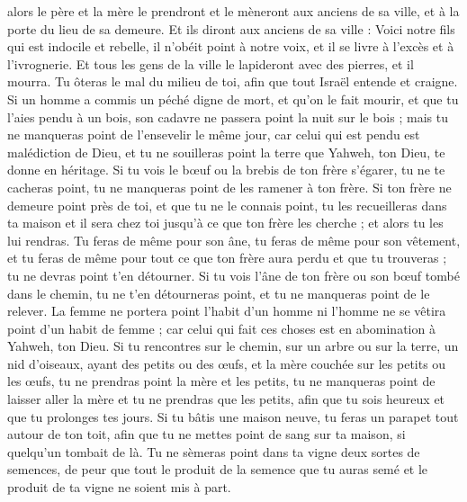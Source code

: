 \begin{multicols}{2}
alors le père et la mère le prendront et le mèneront aux anciens de sa ville, et à la porte du lieu de sa demeure.
Et ils diront aux anciens de sa ville : Voici notre fils qui est indocile et rebelle, il n'obéit point à notre voix, et il se livre à l'excès et à l'ivrognerie.
Et tous les gens de la ville le lapideront avec des pierres, et il mourra. Tu ôteras le mal du milieu de toi, afin que tout Israël entende et craigne.
Si un homme a commis un péché digne de mort, et qu'on le fait mourir, et que tu l'aies pendu à un bois,
son cadavre ne passera point la nuit sur le bois ; mais tu ne manqueras point de l'ensevelir le même jour, car celui qui est pendu est malédiction de Dieu, et tu ne souilleras point la terre que Yahweh, ton Dieu, te donne en héritage.
\VerseOne{}Si tu vois le bœuf ou la brebis de ton frère s'égarer, tu ne te cacheras point, tu ne manqueras point de les ramener à ton frère.
Si ton frère ne demeure point près de toi, et que tu ne le connais point, tu les recueilleras dans ta maison et il sera chez toi jusqu'à ce que ton frère les cherche ; et alors tu les lui rendras.
Tu feras de même pour son âne, tu feras de même pour son vêtement, et tu feras de même pour tout ce que ton frère aura perdu et que tu trouveras ; tu ne devras point t'en détourner.
Si tu vois l'âne de ton frère ou son bœuf tombé dans le chemin, tu ne t'en détourneras point, et tu ne manqueras point de le relever.
La femme ne portera point l'habit d'un homme ni l'homme ne se vêtira point d'un habit de femme ; car celui qui fait ces choses est en abomination à Yahweh, ton Dieu.
Si tu rencontres sur le chemin, sur un arbre ou sur la terre, un nid d'oiseaux, ayant des petits ou des œufs, et la mère couchée sur les petits ou les œufs, tu ne prendras point la mère et les petits,
tu ne manqueras point de laisser aller la mère et tu ne prendras que les petits, afin que tu sois heureux et que tu prolonges tes jours.
Si tu bâtis une maison neuve, tu feras un parapet tout autour de ton toit, afin que tu ne mettes point de sang sur ta maison, si quelqu'un tombait de là.
Tu ne sèmeras point dans ta vigne deux sortes de semences, de peur que tout le produit de la semence que tu auras semé et le produit de ta vigne ne soient mis à part.

\end{multicols}
